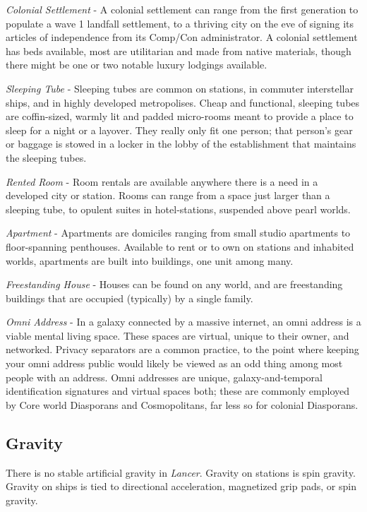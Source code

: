 \textit{Colonial Settlement} - A colonial settlement can range from the first generation to populate a
wave 1 landfall settlement, to a thriving city on the eve of signing its articles of independence
from its Comp/Con administrator. A colonial settlement has beds available, most are utilitarian
and made from native materials, though there might be one or two notable luxury lodgings
available.

\textit{Sleeping Tube} - Sleeping tubes are common on stations, in commuter interstellar ships, and in
highly developed metropolises. Cheap and functional, sleeping tubes are coffin-sized, warmly lit
and padded micro-rooms meant to provide a place to sleep for a night or a layover. They really
only fit one person; that person's gear or baggage is stowed in a locker in the lobby of the
establishment that maintains the sleeping tubes.

\textit{Rented Room} - Room rentals are available anywhere there is a need in a developed city or
station. Rooms can range from a space just larger than a sleeping tube, to opulent suites in
hotel-stations, suspended above pearl worlds.

\textit{Apartment} - Apartments are domiciles ranging from small studio apartments to floor-spanning
penthouses. Available to rent or to own on stations and inhabited worlds, apartments are built
into buildings, one unit among many.

\textit{Freestanding House} - Houses can be found on any world, and are freestanding buildings that are
occupied (typically) by a single family.

\textit{Omni Address} - In a galaxy connected by a massive internet, an omni address is a viable mental
living space. These spaces are virtual, unique to their owner, and networked. Privacy separators
are a common practice, to the point where keeping your omni address public would likely be
viewed as an odd thing among most people with an address. Omni addresses are unique,
galaxy-and-temporal identification signatures and virtual spaces both; these are commonly
employed by Core world Diasporans and Cosmopolitans, far less so for colonial Diasporans.

\subsection{Gravity}

There is no stable artificial gravity in \textit{Lancer}. Gravity on stations is spin gravity. Gravity on ships is
tied to directional acceleration, magnetized grip pads, or spin gravity.

